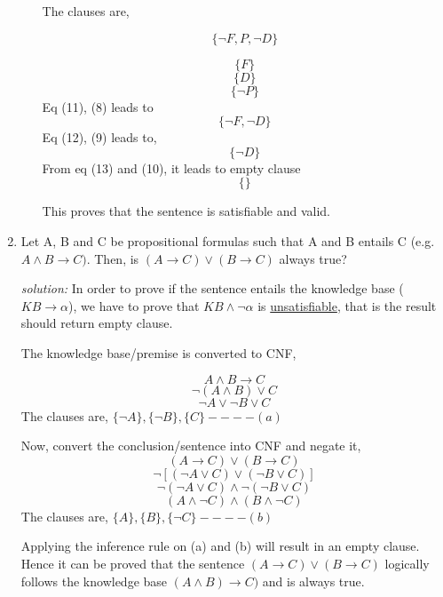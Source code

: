 \documentclass[11pt, a4paper]{report}
\begin{document}
\begin{enumerate}
\begin{itemize}
The clauses are,

\begin{equation}
\lbrace \neg F , P, \neg D \rbrace 
\end{equation}

\begin{equation}
\lbrace F \rbrace 
\end{equation}
\begin{equation}
\lbrace D \rbrace 
\end{equation}
\begin{equation}
\lbrace \neg P \rbrace 
\end{equation}
Eq (11), (8) leads to 
\begin{equation}
\lbrace \neg F , \neg D \rbrace 
\end{equation}
Eq (12), (9) leads to,
\begin{equation}
\lbrace \neg D \rbrace
\end{equation}
From eq (13) and (10), it leads to empty clause
\begin{equation}
\lbrace \rbrace
\end{equation}

This proves that the sentence is satisfiable and valid.
\end{itemize}

\item Let A, B and C be propositional formulas such that A and B entails C (e.g. $ A \wedge B \longrightarrow C)$. Then, is $ (A \longrightarrow C) \vee (B \longrightarrow C)$ always true?

\textit{solution:}
In order to prove if the sentence entails the knowledge base ($KB\longrightarrow \alpha$), we have to prove that $KB \wedge \neg \alpha$ is \underline{unsatisfiable}, that is the result should return empty clause.

The knowledge base/premise is converted to CNF,

$$A \wedge B \longrightarrow C$$
$$\neg(A\wedge B) \vee C$$
$$ \neg A \vee \neg B \vee C $$
The clauses are,
$\lbrace \neg A \rbrace, \lbrace \neg B \rbrace, \lbrace C \rbrace ---- (a)$ 

Now, convert the conclusion/sentence into CNF and negate it,
$$ (A \longrightarrow C)\vee (B \longrightarrow C)$$
$$\neg[(\neg A \vee C) \vee (\neg B \vee C)]$$
$$\neg (\neg A \vee C) \wedge \neg(\neg B \vee C)$$
$$(A \wedge \neg C) \wedge (B \wedge \neg C)$$
The clauses are,
$\lbrace A \rbrace, \lbrace B \rbrace, \lbrace \neg C \rbrace ---- (b)$

Applying the inference rule on (a) and (b) will result in an empty clause. Hence it can be proved that the sentence $(A\rightarrow C) \vee (B \rightarrow C)$ logically follows the knowledge base $(A \wedge B) \rightarrow C)$ and is always true.


\end{enumerate}
\end{document}
